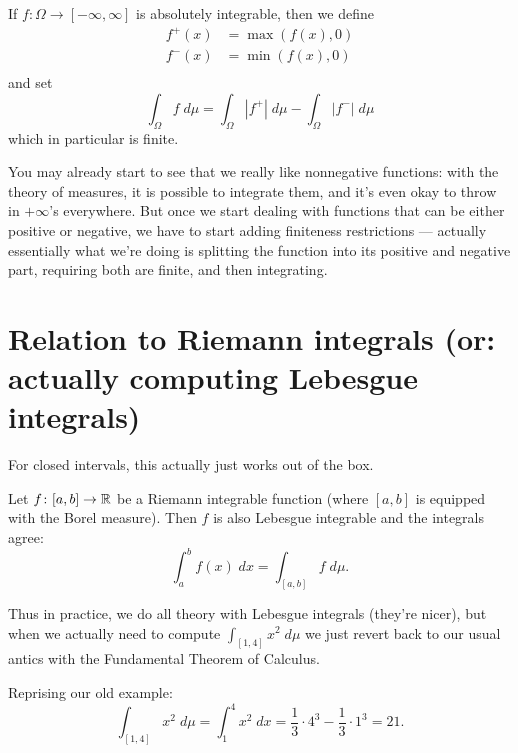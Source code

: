 \begin{step}
	If $f \colon \Omega \to [-\infty, \infty]$ is absolutely integrable,
	then we define
	\begin{align*}
		f^+(x) &= \max\left( f(x), 0 \right) \\
		f^-(x) &= \min\left( f(x), 0 \right) \\
	\end{align*}
	and set
	\[ \int_\Omega f \; d\mu = \int_\Omega |f^+| \; d\mu
		- \int_\Omega |f^-| \; d\mu \]
	which in particular is finite.
\end{step}
You may already start to see that we really like nonnegative functions:
with the theory of measures, it is possible to integrate them,
and it's even okay to throw in $+\infty$'s everywhere.
But once we start dealing with functions that can be either positive or negative,
we have to start adding finiteness restrictions ---
actually essentially what we're doing is splitting
the function into its positive and negative part,
requiring both are finite, and then integrating.

\section{Relation to Riemann integrals (or: actually computing Lebesgue integrals)}
For closed intervals, this actually just works out of the box.
\begin{theorem}
	Let $f \colon [a,b] \to \mathbb R$ be a Riemann integrable function
	(where $[a,b]$ is equipped with the Borel measure).
	Then $f$ is also Lebesgue integrable and the integrals agree:
	\[ \int_a^b f(x) \; dx = \int_{[a,b]} f \; d\mu. \]
\end{theorem}

Thus in practice, we do all theory with Lebesgue integrals (they're nicer),
but when we actually need to compute $\int_{[1,4]} x^2 \; d\mu$
we just revert back to our usual antics with the
Fundamental Theorem of Calculus.
\begin{example}
	Reprising our old example:
	\[ \int_{[1,4]} x^2 \; d\mu
		= \int_1^4 x^2 \; dx
		= \frac13 \cdot 4^3 - \frac13 \cdot 1^3 = 21.  \]
\end{example}

